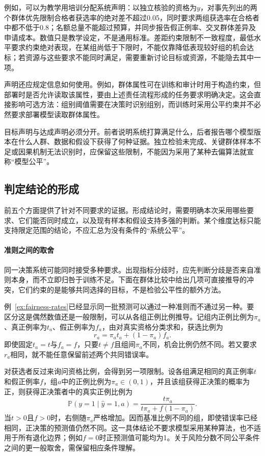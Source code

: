 例如，可以为教学用培训分配系统声明：以独立核验的资格为$y$，对事先列出的两个群体优先限制合格者获选率的绝对差不超过0.05，同时要求两组获选率在合格者中都不低于0.8；名额总量不能超过预算，并同步报告假正例率、交叉群体差异及申请成本。数值只是教学设定，不是通用标准。差距约束限制不一致程度，最低水平要求约束绝对表现，在某组尚低于下限时，不能仅靠降低表现较好组的机会达标；若资源与这些要求不能同时满足，需要重新讨论目标或资源，不能隐去其中一项。

声明还应规定信息如何使用。例如，群体属性可在训练和审计时用于构造约束，但部署时是否允许读取该属性，要由上述责任流程形成的任务要求明确决定。这会直接影响可选方法：组别阈值需要在决策时识别组别，而训练时采用公平约束并不必然要求部署模型读取群体属性。

目标声明与达成声明必须分开。前者说明系统打算满足什么，后者报告哪个模型版本在什么人群、数据和假设下获得了何种证据。独立检验未完成、关键群体样本不足或因果机制无法识别时，应保留这些限制，不能因为采用了某种去偏算法就宣称“模型公平”。

\subsection{判定结论的形成}
\label{sec:fairness-compatibility}

前五个方面提供了针对不同要求的证据。形成结论时，需要明确本次采用哪些要求、它们能否同时成立，以及现有样本和假设支持多强的判断。某个维度达标只能支持限定范围的结论，不应汇总为没有条件的“系统公平”。

\paragraph{准则之间的取舍}

同一决策系统可能同时接受多种要求。出现指标分歧时，应先判断分歧是否来自准则本身，而不立即归咎于训练不足。下面在群体比较中给出几项可直接推导的冲突，它们约束的是能够共同选择的目标，不是检验公平性的额外方法。

例~\ref{ex:fairness-rates}已经显示同一批预测可以通过一种准则而不通过另一种。要区分这是偶然数值还是一般限制，可以从各组正例比例推导。记组内正例比例为$\pi_a$、真正例率为$t_a$、假正例率为$f_a$，由对真实资格分类求和，获选比例为
\[
 r_a=\pi_a t_a+(1-\pi_a)f_a.
\]
即使固定$t_a=t$与$f_a=f$，只要$t\ne f$且组间$\pi_a$不同，机会比例仍然不同。若又要求$r_a$相同，就不能任意保留前述两个共同错误率。

对获选者反过来询问资格比例，会得到另一项限制。设各组满足相同的真正例率$t$和假正例率$f$，组$a$中的正例比例为$\pi_a\in(0,1)$，并且该组获得正决策的概率为正，则获得正决策者中的真实正例比例为
\begin{equation}
 \mathbb P(y=1\mid\hat y=1,a)
 =\frac{t\pi_a}{t\pi_a+f(1-\pi_a)}.
 \label{eq:fairness-predictive-value}
\end{equation}
当$t>0$且$f>0$时，右侧随$\pi_a$严格增加。因而基准比例不同的组，即使错误率已经相同，正决策的预测值仍然不同。这一具体结论不要求模型采用某种算法，也不适用于所有退化边界；例如$f=0$时正预测值可能均为1。关于风险分数不同公平条件之间的更一般取舍，需保留相应条件理解。

